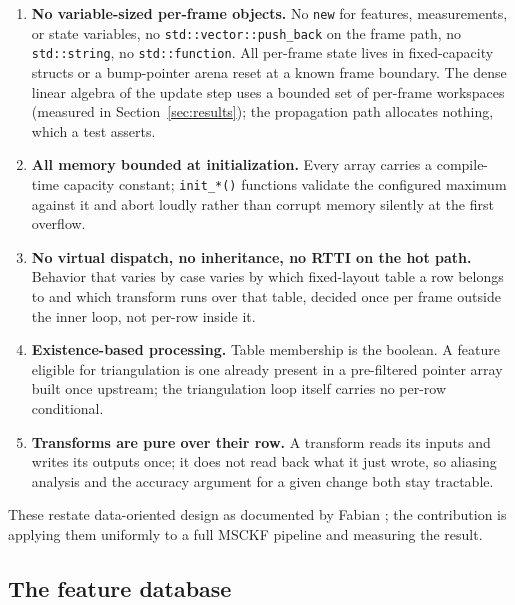 \documentclass[10pt,conference,letterpaper]{IEEEtran}
\begin{document}
\begin{enumerate}
\item \textbf{No variable-sized per-frame objects.} No \texttt{new}
  for features, measurements, or state variables, no
  \texttt{std::vector::push\_back} on the frame path, no
  \texttt{std::string}, no \texttt{std::function}. All per-frame state
  lives in fixed-capacity structs or a bump-pointer arena reset at a known
  frame boundary. The dense linear algebra of the update step uses a
  bounded set of per-frame workspaces (measured in
  Section~\ref{sec:results}); the propagation path allocates nothing,
  which a test asserts.
\item \textbf{All memory bounded at initialization.} Every array carries a
  compile-time capacity constant; \texttt{init\_*()} functions validate the
  configured maximum against it and abort loudly rather than corrupt memory
  silently at the first overflow.
\item \textbf{No virtual dispatch, no inheritance, no RTTI on the hot path.}
  Behavior that varies by case varies by which fixed-layout table a row
  belongs to and which transform runs over that table, decided once per
  frame outside the inner loop, not per-row inside it.
\item \textbf{Existence-based processing.} Table membership is the boolean.
  A feature eligible for triangulation is one already present in a
  pre-filtered pointer array built once upstream; the triangulation loop
  itself carries no per-row conditional.
\item \textbf{Transforms are pure over their row.} A transform reads its
  inputs and writes its outputs once; it does not read back what it just
  wrote, so aliasing analysis and the accuracy argument for a given change
  both stay tractable.
\end{enumerate}

These restate data-oriented design as documented by Fabian
\cite{fabian2018dod}; the contribution is applying them uniformly to a
full MSCKF pipeline and measuring the result.

\subsection{The feature database}
\end{document}
